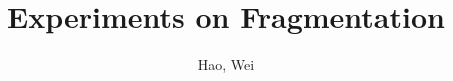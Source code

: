 \documentclass{article}
\begin{document}
\title{Experiments on Fragmentation}
\author{Hao, Wei}
\maketitle
\newpage




% 



\begin{appendix}  





 
\end{appendix} 
\end{document}
